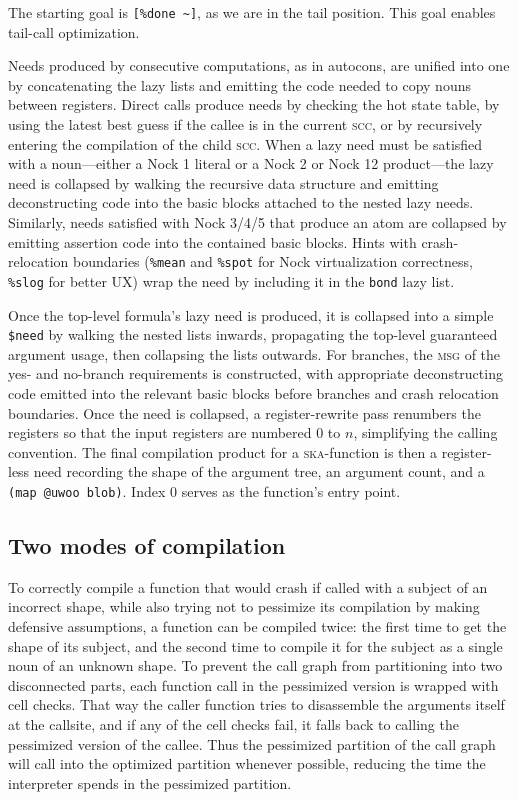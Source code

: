 \documentclass[twoside]{article}
\begin{document}
The starting goal is \lstinline[style=inlinecode]{[%done ~]}, as we are in the tail position. This goal enables tail-call optimization.

Needs produced by consecutive computations, as in autocons, are unified into one by concatenating the lazy lists and emitting the code needed to copy nouns between registers. Direct calls produce needs by checking the hot state table, by using the latest best guess if the callee is in the current \textsc{scc}, or by recursively entering the compilation of the child \textsc{scc}. When a lazy need must be satisfied with a noun---either a Nock 1 literal or a Nock 2 or Nock 12 product---the lazy need is collapsed by walking the recursive data structure and emitting deconstructing code into the basic blocks attached to the nested lazy needs. Similarly, needs satisfied with Nock 3/4/5 that produce an atom are collapsed by emitting assertion code into the contained basic blocks. Hints with crash-relocation boundaries (\lstinline[style=inlinecode]{%mean} and \lstinline[style=inlinecode]{%spot} for Nock virtualization correctness, \lstinline[style=inlinecode]{%slog} for better UX) wrap the need by including it in the \lstinline[style=inlinecode]{bond} lazy list.

Once the top-level formula's lazy need is produced, it is collapsed into a simple \lstinline[style=inlinecode]{$need} by walking the nested lists inwards, propagating the top-level guaranteed argument usage, then collapsing the lists outwards. For branches, the \textsc{msg} of the yes- and no-branch requirements is constructed, with appropriate deconstructing code emitted into the relevant basic blocks before branches and crash relocation boundaries. Once the need is collapsed, a register-rewrite pass renumbers the registers so that the input registers are numbered 0 to $n$, simplifying the calling convention. The final compilation product for a \textsc{ska}-function is then a register-less need recording the shape of the argument tree, an argument count, and a \lstinline[style=inlinecode]{(map @uwoo blob)}. Index 0 serves as the function's entry point.

\subsection{Two modes of compilation}

To correctly compile a function that would crash if called with a subject of an incorrect shape, while also trying not to pessimize its compilation by making defensive assumptions, a function can be compiled twice: the first time to get the shape of its subject, and the second time to compile it for the subject as a single noun of an unknown shape. To prevent the call graph from partitioning into two disconnected parts, each function call in the pessimized version is wrapped with cell checks. That way the caller function tries to disassemble the arguments itself at the callsite, and if any of the cell checks fail, it falls back to calling the pessimized version of the callee. Thus the pessimized partition of the call graph will call into the optimized partition whenever possible, reducing the time the interpreter spends in the pessimized partition.\tombstone

\printbibliography
\end{document}
